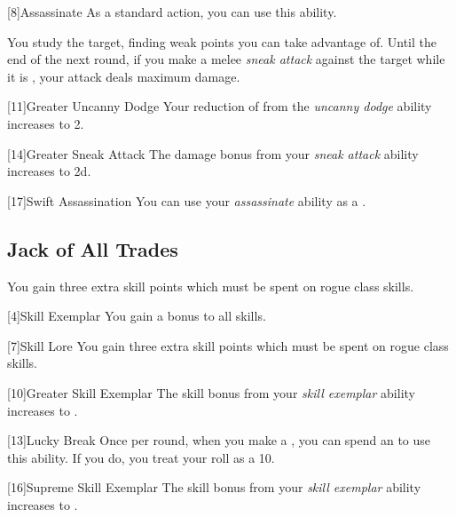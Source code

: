         [8]{Assassinate} As a standard action, you can use this ability.
        \begin{ability}
            \begin{spelltargetinginfo}
            \end{spelltargetinginfo}
            \begin{spelleffects}
                \spelleffect You study the target, finding weak points you can take advantage of.
                Until the end of the next round, if you make a melee \textit{sneak attack} against the target while it is \unaware, your attack deals maximum damage.
            \end{spelleffects}
        \end{ability}

        [11]{Greater Uncanny Dodge}
        Your reduction of  from the \textit{uncanny dodge} ability increases to 2.

        [14]{Greater Sneak Attack}
        The damage bonus from your \textit{sneak attack} ability increases to \plus2d.

        [17]{Swift Assassination} You can use your \textit{assassinate} ability as a .

    \subsection{Jack of All Trades}

         You gain three extra skill points which must be spent on rogue class skills.

        [4]{Skill Exemplar} You gain a  bonus to all skills.

        [7]{Skill Lore} You gain three extra skill points which must be spent on rogue class skills.

        [10]{Greater Skill Exemplar} The skill bonus from your \textit{skill exemplar} ability increases to .

        [13]{Lucky Break} Once per round, when you make a , you can spend an  to use this ability.
        If you do, you treat your roll as a 10.

        [16]{Supreme Skill Exemplar} The skill bonus from your \textit{skill exemplar} ability increases to .

